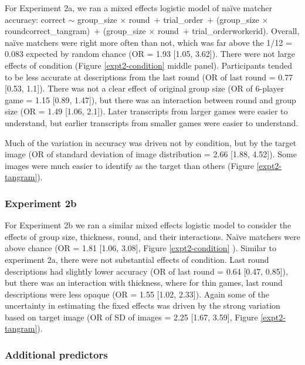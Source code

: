 \documentclass[10pt, letterpaper]{article}
\begin{document}
For Experiment 2a, we ran a mixed effects logistic model of naïve
matcher accuracy: correct \({\sim}\) group\_size \({\times}\)
round~\({+}\) trial\_order~\({+}\) (group\_size \({\times}\)
round\textbar correct\_tangram)~\({+}\) (group\_size \({\times}\)
round~\({+}\) trial\_order\textbar workerid). Overall, naïve matchers
were right more often than not, which was far above the 1/12 = 0.083
expected by random chance (OR = 1.93 {[}1.05, 3.62{]}). There were not
large effects of condition (Figure \ref{expt2-condition} middle panel).
Participants tended to be less accurate at descriptions from the last
round (OR of last round = 0.77 {[}0.53, 1.1{]}). There was not a clear
effect of original group size (OR of 6-player game = 1.15 {[}0.89,
1.47{]}), but there was an interaction between round and group size (OR
= 1.49 {[}1.06, 2.1{]}). Later transcripts from larger games were easier
to understand, but earlier transcripts from smaller games were easier to
understand.

Much of the variation in accuracy was driven not by condition, but by
the target image (OR of standard deviation of image distribution = 2.66
{[}1.88, 4.52{]}). Some images were much easier to identify as the
target than others (Figure \ref{expt2-tangram}).

\subsubsection{Experiment 2b}\label{experiment-2b-1}

For Experiment 2b we ran a similar mixed effects logistic model to
consider the effects of group size, thickness, round, and their
interactions. Naïve matchers were above chance (OR = 1.81 {[}1.06,
3.08{]}, Figure \ref{expt2-condition} ). Similar to experiment 2a, there
were not substantial effects of condition. Last round descriptions had
slightly lower accuracy (OR of last round = 0.64 {[}0.47, 0.85{]}), but
there was an interaction with thickness, where for thin games, last
round descriptions were less opaque (OR = 1.55 {[}1.02, 2.33{]}). Again
some of the uncertainty in estimating the fixed effects was driven by
the strong variation based on target image (OR of SD of images = 2.25
{[}1.67, 3.59{]}, Figure \ref{expt2-tangram}).

\subsubsection{Additional predictors}\label{additional-predictors}
\end{document}
